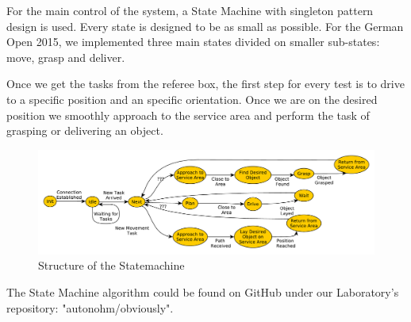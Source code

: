 For the main control of the system, a State Machine with singleton pattern design is used. Every state is designed to be as small as possible. For the German Open 2015, we implemented three main states divided on smaller sub-states: move, grasp and deliver.

Once we get the tasks from the referee box, the first step for every test is to drive to a specific position and an specific orientation. Once we are on the desired position we smoothly approach to the service area and perform the task of grasping or delivering an object. 	


\begin{figure}[htbp]
	\centering
	\includegraphics[width=\textwidth]{img/sm}
	\caption{Structure of the Statemachine}
	\label{fig:SM}
\end{figure}


The State Machine algorithm could be found on GitHub under our Laboratory's repository: "autonohm/obviously". 